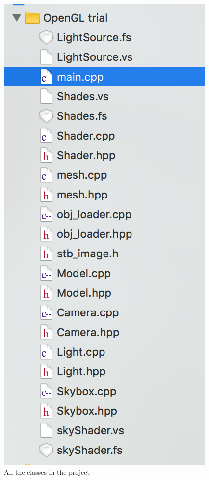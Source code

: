 \documentclass[a4paper,11pt]{article}
\begin{document}
		
		\begin{figure}
		\centering
		\includegraphics[scale=0.5]{class.png}
		\caption{All the classes in the project}
		\label{class}
		\end{figure}
		
\end{document}
